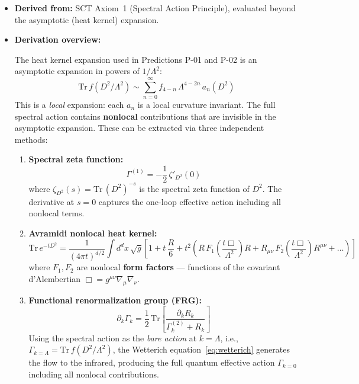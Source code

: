 \documentclass[11pt,a4paper]{article}
\begin{document}
\begin{itemize}[leftmargin=2em]
  \item \textbf{Derived from:} SCT Axiom~1 (Spectral Action Principle), evaluated beyond the asymptotic (heat kernel) expansion.
  \item \textbf{Derivation overview:}

  The heat kernel expansion used in Predictions P-01 and P-02 is an asymptotic expansion in powers of $1/\Lambda^2$:
  \begin{equation}
    \mathrm{Tr}\,f(D^2/\Lambda^2) \sim \sum_{n=0}^{\infty} f_{4-n}\,\Lambda^{4-2n}\,a_n(D^2)
    \label{eq:asymptotic}
  \end{equation}
  This is a \emph{local} expansion: each $a_n$ is a local curvature invariant. The full spectral action contains \textbf{nonlocal} contributions that are invisible in the asymptotic expansion. These can be extracted via three independent methods:

  \begin{enumerate}
    \item \textbf{Spectral zeta function:}
      \begin{equation}
        \Gamma^{(1)} = -\frac{1}{2}\,\zeta'_{D^2}(0)
        \label{eq:zeta-method}
      \end{equation}
      where $\zeta_{D^2}(s) = \mathrm{Tr}\,(D^2)^{-s}$ is the spectral zeta function of $D^2$. The derivative at $s=0$ captures the one-loop effective action including all nonlocal terms.

    \item \textbf{Avramidi nonlocal heat kernel:}
      \begin{equation}
        \mathrm{Tr}\,e^{-t D^2} = \frac{1}{(4\pi t)^{d/2}}\int d^dx\,\sqrt{g}\left[
          1 + t\,\frac{R}{6} + t^2\left(
            R\,F_1\!\left(\frac{t\Box}{\Lambda^2}\right)R
            + R_{\mu\nu}\,F_2\!\left(\frac{t\Box}{\Lambda^2}\right)R^{\mu\nu}
            + \ldots
          \right)
        \right]
        \label{eq:avramidi}
      \end{equation}
      where $F_1, F_2$ are nonlocal \textbf{form factors} --- functions of the covariant d'Alembertian $\Box = g^{\mu\nu}\nabla_\mu\nabla_\nu$.

    \item \textbf{Functional renormalization group (FRG):}
      \begin{equation}
        \partial_k \Gamma_k = \frac{1}{2}\,\mathrm{Tr}\left[\frac{\partial_k R_k}{\Gamma_k^{(2)} + R_k}\right]
        \label{eq:wetterich}
      \end{equation}
      Using the spectral action as the \emph{bare action} at $k = \Lambda$, i.e., $\Gamma_{k=\Lambda} = \mathrm{Tr}\,f(D^2/\Lambda^2)$, the Wetterich equation~\eqref{eq:wetterich} generates the flow to the infrared, producing the full quantum effective action $\Gamma_{k=0}$ including all nonlocal contributions.
  \end{enumerate}


\end{itemize}
\end{document}
